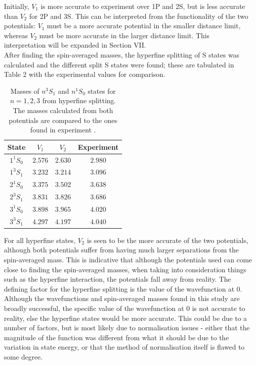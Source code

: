 \documentclass[10pt, twocolumn]{article}
\begin{document}
Initially, $V_1$ is more accurate to experiment over 1P and 2S, but is less accurate than $V_2$ for 2P and 3S. 
This can be interpreted from the functionality of the two potentials: $V_1$ must be a more accurate potential in the smaller distance limit, whereas $V_2$ must be more accurate in the larger distance limit. 
This interpretation will be expanded in Section \RN{7}.\\
After finding the spin-averaged masses, the hyperfine splitting of S states was calculated and the different split S states were found; these are tabulated in Table 2 with the experimental values for comparison.
\begin{table}[H]
    \vspace{10pt}
    \centering
    \begin{tabular}{|c|c|c|c|}
        \hline
        \rowcolor{lightgray} State & $V_1$ & $V_2$ & Experiment \\
        \hline
        $1^1S_0$ & $2.576$ & $2.630$ & $2.980$ \\
        \hline
        $1^3S_1$ & $3.232$ & $3.214$ & $3.096$ \\
        \hline
        $2^1S_0$ & $3.375$ & $3.502$ & $3.638$ \\
        \hline
        $2^3S_1$ & $3.831$ & $3.826$ & $3.686$ \\
        \hline
        $3^1S_0$ & $3.898$ & $3.965$ & $4.020$ \\
        \hline
        $3^3S_1$ & $4.297$ & $4.197$ & $4.040$ \\
        \hline
    \end{tabular}
    \caption{Masses of $n^3S_1$ and $n^1S_0$ states for $n = 1,2,3$ from hyperfine splitting. The masses calculated from both potentials are compared to the ones found in experiment \cite{4}.}
\end{table}
For all hyperfine states, $V_2$ is seen to be the more accurate of the two potentials, although both potentials suffer from having much larger separations from the spin-averaged mass. 
This is indicative that although the potentials used can come close to finding the spin-averaged masses, when taking into consideration things such as the hyperfine interaction, the potentials fall away from reality. 
The defining factor for the hyperfine splitting is the value of the wavefunction at 0. 
Although the wavefunctions and spin-averaged masses found in this study are broadly successful, the specific value of the wavefunction at 0 is not accurate to reality, else the hyperfine states would be more accurate. 
This could be due to a number of factors, but is most likely due to normalisation issues - either that the magnitude of the function was different from what it should be due to the variation in state energy, or that the method of normalisation itself is flawed to some degree.
\end{document}
